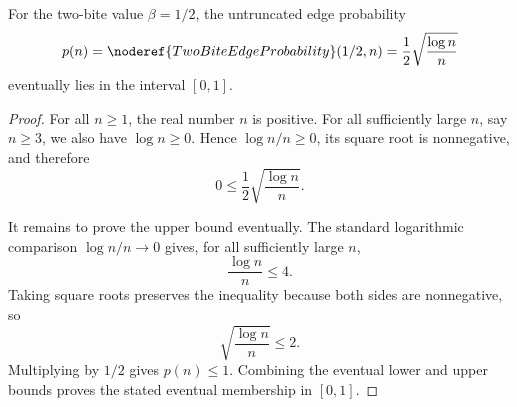 \begin{lemma}
For the two-bite value \(\beta=1/2\), the untruncated edge probability
\[
p(n)=\noderef{TwoBiteEdgeProbability}(1/2,n)
=\frac12\sqrt{\frac{\log n}{n}}
\]
eventually lies in the interval \([0,1]\).
\end{lemma}
\begin{proof}
For all \(n\ge1\), the real number \(n\) is positive.  For all sufficiently
large \(n\), say \(n\ge3\), we also have \(\log n\ge0\).  Hence
\(\log n/n\ge0\), its square root is nonnegative, and therefore
\[
0\le \frac12\sqrt{\frac{\log n}{n}}.
\]

It remains to prove the upper bound eventually.  The standard logarithmic
comparison \(\log n/n\to0\) gives, for all sufficiently large \(n\),
\[
\frac{\log n}{n}\le4.
\]
Taking square roots preserves the inequality because both sides are
nonnegative, so
\[
\sqrt{\frac{\log n}{n}}\le2.
\]
Multiplying by \(1/2\) gives \(p(n)\le1\).  Combining the eventual lower and
upper bounds proves the stated eventual membership in \([0,1]\).
\end{proof}

